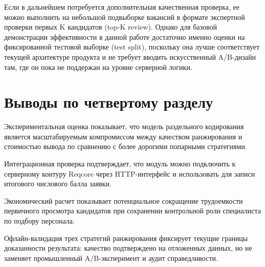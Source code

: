 Если в дальнейшем потребуется дополнительная качественная проверка, ее можно выполнить на небольшой подвыборке вакансий в формате экспертной проверки первых K кандидатов (top-K review). Однако для базовой демонстрации эффективности в данной работе достаточно именно оценки на фиксированной тестовой выборке (test split), поскольку она лучше соответствует текущей архитектуре продукта и не требует вводить искусственный A/B-дизайн там, где он пока не поддержан на уровне серверной логики.\par
\section{Выводы по четвертому разделу}
\begin{compactenum}
  \item Экспериментальная оценка показывает, что модель раздельного кодирования является масштабируемым компромиссом между качеством ранжирования и стоимостью вывода по сравнению с более дорогими попарными стратегиями.
  \item Интеграционная проверка подтверждает, что модуль можно подключить к серверному контуру Reqcore через HTTP-интерфейс и использовать для записи итогового числового балла заявки.
  \item Экономический расчет показывает потенциальное сокращение трудоемкости первичного просмотра кандидатов при сохранении контрольной роли специалиста по подбору персонала.
  \item Офлайн-валидация трех стратегий ранжирования фиксирует текущие границы доказанности результата: качество подтверждено на отложенных данных, но не заменяет промышленный A/B-эксперимент и аудит справедливости.
\end{compactenum}
